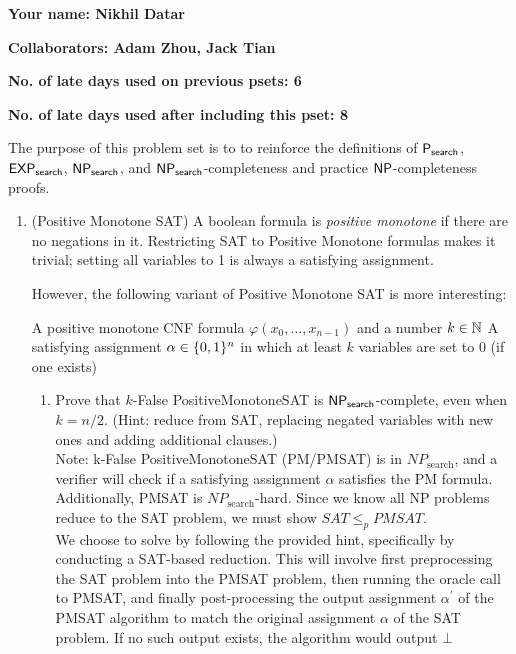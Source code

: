 \documentclass[11pt]{article}
\begin{document}


\textbf{Your name: Nikhil Datar}

\textbf{Collaborators: Adam Zhou, Jack Tian}

\textbf{No. of late days used on previous psets: 6}

\textbf{No. of late days used after including this pset: 8}

\vspace{1em}

\noindent The purpose of this problem set is to to reinforce the definitions of $\mathsf{P_{search}}$, $\mathsf{EXP_{search}}$, $\mathsf{NP_{search}}$, and $\mathsf{NP_{search}}$-completeness and practice $\mathsf{NP}$-completeness proofs. 

\begin{enumerate}
    \item (Positive Monotone SAT)
    A boolean formula is {\em positive monotone} if there are no negations in it.  Restricting SAT to Positive Monotone formulas makes it trivial; setting all variables to 1 is always a satisfying assignment.
    
    However, the following variant of Positive Monotone SAT is more interesting:
    
        {A positive monotone CNF formula $\varphi(x_0,\ldots,x_{n-1})$ and a number $k\in \mathbb{N}$}
        {A satisfying assignment $\alpha\in\{0,1\}^n$ in which at least $k$ variables are set to 0 (if one exists)}
    
    \begin{enumerate}
        \item Prove that $k$-False PositiveMonotoneSAT is $\mathsf{NP_{search}}$-complete, even when $k=n/2$.  (Hint: reduce from SAT, replacing negated variables with new ones and adding additional clauses.) \\
        
        Note: k-False PositiveMonotoneSAT (PM/PMSAT) is in $NP_{\text{search}}$, and a verifier will check if a satisfying assignment $\alpha$ satisfies the PM formula. Additionally, PMSAT is $NP_{\text{search}}$-hard. Since we know all NP problems reduce to the SAT problem, we must show $SAT \leq_p PMSAT$. \\
        
        We choose to solve by following the provided hint, specifically by conducting a SAT-based reduction. This will involve first preprocessing the SAT problem into the PMSAT problem, then running the oracle call to PMSAT, and finally post-processing the output assignment $\alpha^'$ of the PMSAT algorithm to match the original assignment $\alpha$ of the SAT problem. If no such output exists, the algorithm would output $\bot$ \\
         

\end{enumerate}
\end{enumerate}
\end{document}
